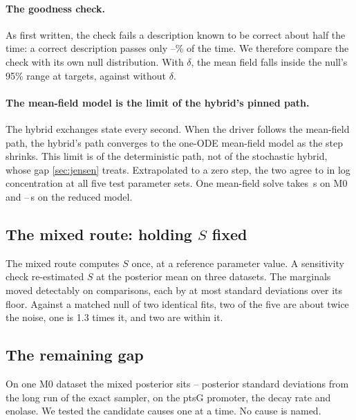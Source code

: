 \paragraph{The goodness check.} As first written, the check fails a description known
to be correct about half the time: a correct description passes only
--\% of the time. We therefore compare the check with
its own null distribution. With $\delta$, the mean field falls inside the null's 95\%
range at  targets, against  without $\delta$.

\paragraph{The mean-field model is the limit of the hybrid's pinned path.} The hybrid
exchanges state every second. When the driver follows the mean-field path, the
hybrid's path converges to the one-ODE mean-field model as the step shrinks. This
limit is of the deterministic path, not of the stochastic hybrid, whose gap
\cref{sec:jensen} treats. Extrapolated to a zero step, the two agree to
 in log concentration at all five test parameter sets. One
mean-field solve takes \,s on M0 and --\,s
on the reduced model.

\subsection{\texorpdfstring{The mixed route: holding $S$ fixed}{The mixed route: holding S fixed}}
\label{app:sfixed}

The mixed route computes $S$ once, at a reference parameter value. A sensitivity check
re-estimated $S$ at the posterior mean on three datasets. The marginals moved
detectably on  comparisons, each by at most  standard
deviations over its floor. Against a matched null of two identical fits, two of the
five are about twice the noise, one is 1.3 times it, and two are within it.

\subsection{The remaining gap}
\label{app:gap}

On one M0 dataset the mixed posterior sits -- posterior standard
deviations from the long run of the exact sampler, on the ptsG promoter, the decay rate and
enolase. We tested the candidate causes one at a time. No cause is named.

